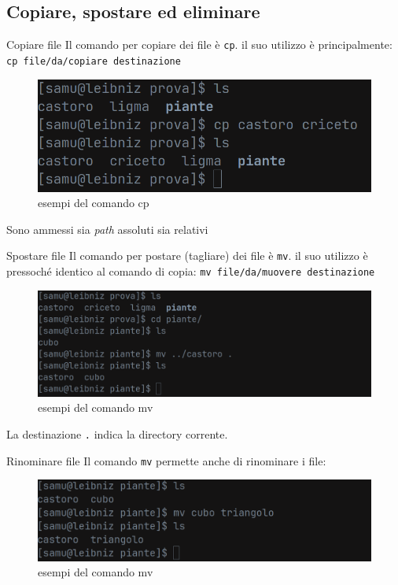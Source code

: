 \documentclass{beamer}
\begin{document}
\subsection{Copiare, spostare ed eliminare}
\begin{frame}{Copiare file}
  Il comando per copiare dei file è \texttt{cp}. il suo utilizzo è 
  principalmente: \texttt{cp file/da/copiare destinazione}
  \begin{figure}
    \includegraphics[width=\textwidth]{assets/command-cp.png}
    \caption{esempi del comando cp}
  \end{figure}
  Sono ammessi sia \textit{path} assoluti sia relativi
\end{frame}

\begin{frame}{Spostare file}
  Il comando per postare (tagliare) dei file è \texttt{mv}. il suo utilizzo è 
  pressoché identico al comando di copia: \texttt{mv file/da/muovere 
  destinazione}
  \begin{figure}
    \includegraphics[width=\textwidth]{assets/command-mv.png}
    \caption{esempi del comando mv}
  \end{figure}
  La destinazione \texttt{.} indica la directory corrente.
\end{frame}

\begin{frame}{Rinominare file}
  Il comando \texttt{mv} permette anche di rinominare i file:
  \begin{figure}
    \includegraphics[width=\textwidth]{assets/command-mv-rename.png}
    \caption{esempi del comando mv}
  \end{figure}
\end{frame}
\end{document}
